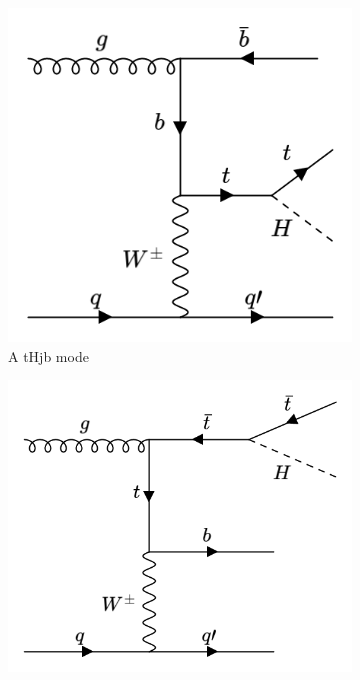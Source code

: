 \begin{figure}[htp]
  \centering
       \begin{subfigure}[b]{0.3\textwidth}
         \centering
         \includegraphics[width=\textwidth]{figures/theory_chapter/tHjb1.png}
         \caption{A tHjb mode}
         \label{fig:tHjb1}
     \end{subfigure}
     \hfill
         \begin{subfigure}[b]{0.3\textwidth}
         \centering
         \includegraphics[width=\textwidth]{figures/theory_chapter/tHjb2.png}

\end{subfigure}
\end{figure}
